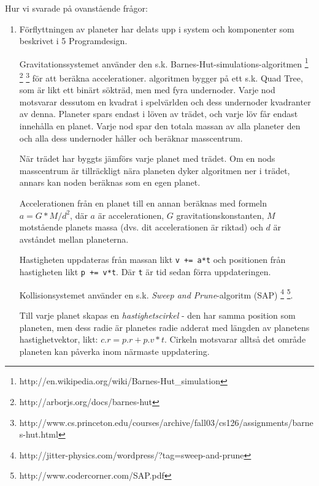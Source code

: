 
Hur vi svarade på ovanstående frågor:
\begin{enumerate}
    \item Förflyttningen av planeter har delats upp i system och komponenter
        som beskrivet i 5 Programdesign.

        \vspace{6pt}

        Gravitationssystemet använder den s.k.
        Barnes-Hut-simulations-algoritmen
        \footnote{http://en.wikipedia.org/wiki/Barnes-Hut\_simulation}
        \footnote{http://arborjs.org/docs/barnes-hut}
        \footnote{http://www.cs.princeton.edu/courses/archive/fall03/cs126/assignments/barnes-hut.html}
        för att beräkna accelerationer.
        algoritmen bygger på ett s.k. Quad Tree, som är likt ett
        binärt sökträd, men med fyra undernoder.
        Varje nod motsvarar dessutom en kvadrat i spelvärlden och
        dess undernoder kvadranter av denna.
        Planeter spars endast i löven av trädet, och varje löv
        får endast innehålla en planet.
        Varje nod spar den totala massan av alla planeter den och
        alla dess undernoder håller och beräknar masscentrum.

        När trädet har byggts jämförs varje planet med trädet.
        Om en nods masscentrum är tillräckligt nära planeten
        dyker algoritmen ner i trädet, annars kan noden beräknas
        som en egen planet.

        Accelerationen från en planet till en annan beräknas med
        formeln $a = G*M/d^2$, där $a$ är accelerationen, $G$
        gravitationskonstanten, $M$ motstående planets massa (dvs.
        dit accelerationen är riktad) och $d$ är avståndet mellan
        planeterna.

        Hastigheten uppdateras från massan likt \verb#v += a*t#
        och positionen från hastigheten likt \verb#p += v*t#.
        Där \verb#t# är tid sedan förra uppdateringen.

        \vspace{12pt}

        Kollisionsystemet använder en s.k.
        \textit{Sweep and Prune}-algoritm (SAP)
        \footnote{http://jitter-physics.com/wordpress/?tag=sweep-and-prune}
        \footnote{http://www.codercorner.com/SAP.pdf}.


	
        Till varje planet skapas en \textit{hastighetscirkel} - 
        den har samma position som planeten, men dess radie
        är planetes radie adderat med längden av planetens hastighetvektor,
        likt: $c.r = p.r + p.v * t$.
        Cirkeln motsvarar alltså det område planeten kan påverka
        inom närmaste uppdatering.


\end{enumerate}
